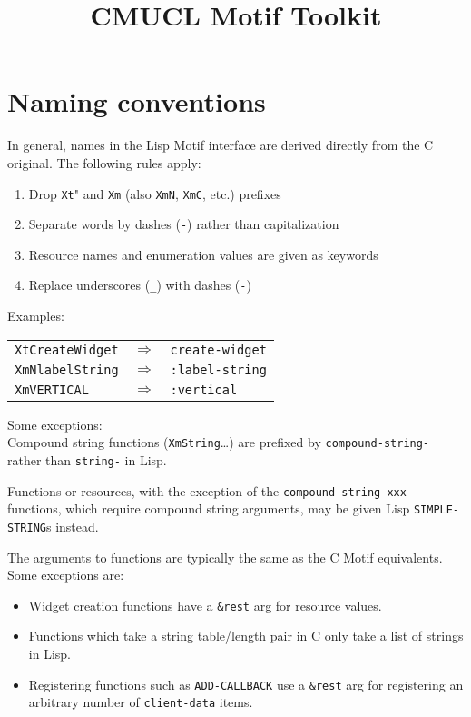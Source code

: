 \documentclass{article}
\title{CMUCL Motif Toolkit}
\begin{document}
\maketitle

\section{Naming conventions}

In general, names in the Lisp Motif interface are derived directly from
the C original.  The following rules apply:
\begin{enumerate}
   \item Drop \texttt{Xt}" and \texttt{Xm} (also \texttt{XmN},
	 \texttt{XmC}, etc.) prefixes 
   \item Separate words by dashes (\texttt{-}) rather than capitalization
   \item Resource names and enumeration values are given as keywords
   \item Replace underscores (\texttt{\_}) with dashes (\texttt{-})
\end{enumerate}

\vspace{2mm}

\noindent
Examples:\\[2mm]
\begin{tabular}{lcl}
\texttt{XtCreateWidget} & $\Longrightarrow$ & \texttt{create-widget}\\
\texttt{XmNlabelString} & $\Longrightarrow$ & \texttt{:label-string}\\
\texttt{XmVERTICAL}     & $\Longrightarrow$ & \texttt{:vertical}\\
\end{tabular}

\vspace{2mm}

\noindent
Some exceptions:\\
Compound string functions (\texttt{XmString}\ldots) are prefixed by
\texttt{compound-string-} rather than \texttt{string-} in Lisp.

Functions or resources, with the exception of the \texttt{compound-string-xxx}
functions, which require compound string arguments, may be given Lisp
\texttt{SIMPLE-STRING}s instead.

The arguments to functions are typically the same as the C Motif
equivalents.  Some exceptions are:
\begin{itemize}
\item	Widget creation functions have a \texttt{\&rest} arg for
	resource values.
\item	Functions which take a string table/length pair in C only take a
	list of strings in Lisp.
\item	Registering functions such as \texttt{ADD-CALLBACK} use a
	\texttt{\&rest} arg for registering an arbitrary number of
	\texttt{client-data} items. 
\end{itemize}
\end{document}

